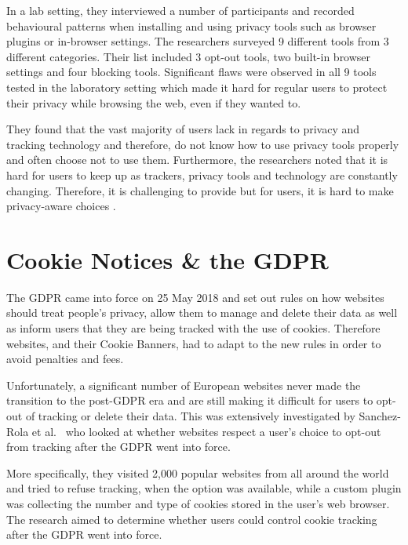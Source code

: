\documentclass[../main.tex]{subfiles}
\begin{document}
In a lab setting, they interviewed a number of participants and recorded behavioural patterns when installing and using privacy tools such as browser plugins or in-browser settings. The researchers surveyed 9 different tools from 3 different categories. Their list included 3 opt-out tools, two built-in browser settings and four blocking tools. Significant flaws were observed in all 9 tools tested in the laboratory setting which made it hard for regular users to protect their privacy while browsing the web, even if they wanted to. 

They found that the vast majority of users lack  in regards to privacy and tracking technology and therefore, do not know how to use privacy tools properly and often choose not to use them. Furthermore, the researchers noted that it is hard for users to keep up as trackers, privacy tools and technology are constantly changing. Therefore, it is challenging to provide  but for users, it is hard to make privacy-aware choices .

\section{Cookie Notices \& the GDPR}
The GDPR came into force on 25 May 2018 and set out rules on how websites should treat people's privacy, allow them to manage and delete their data as well as inform users that they are being tracked with the use of cookies. Therefore websites, and their Cookie Banners, had to adapt to the new rules in order to avoid penalties and fees. 

Unfortunately, a significant number of European websites never made the transition to the post-GDPR era and are still making it difficult for users to opt-out of tracking or delete their data. This was extensively investigated by Sanchez-Rola et al.~\cite{sanchez2019can} who looked at whether websites respect a user’s choice to opt-out from tracking after the GDPR went into force. 

More specifically, they visited 2,000 popular websites from all around the world and tried to refuse tracking, when the option was available, while a custom plugin was collecting the number and type of cookies stored in the user’s web browser. The research aimed to determine whether users could control cookie tracking after the GDPR went into force. 
\end{document}
